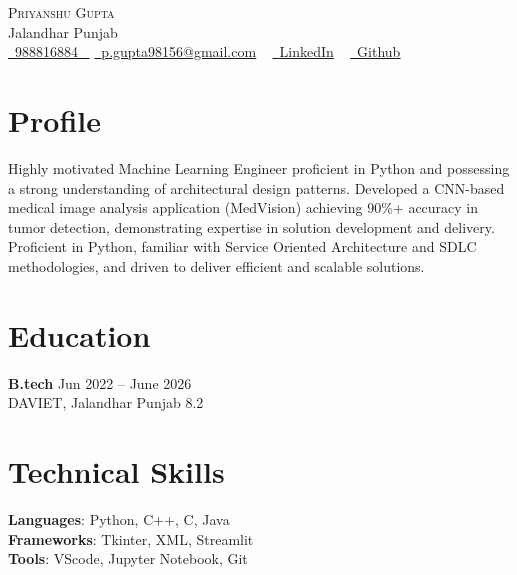\documentclass[letterpaper,11pt]{article}
\begin{document}

\begin{center}
    {\Huge \scshape Priyanshu Gupta} \\ \vspace{1pt}
    Jalandhar Punjab \\ \vspace{1pt}
    \small 
    \small \href{988816884}{ \raisebox{-0.1\height}\faPhone\ \underline{988816884} ~} 
    \href{p.gupta98156@gmail.com}{\raisebox{-0.2\height}\faEnvelope\  \underline{p.gupta98156@gmail.com}} ~
    \href{https://www.linkedin.com/in/priyanshu-gupta18/}{\raisebox{-0.2\height}\faLinkedinSquare\ \underline{LinkedIn}}  ~
    \href{https://github.com/Priyanshu98156/MedVision}{\raisebox{-0.2\height}\faGithub\ \underline{Github}} ~
\end{center}
% 

\section{Profile}
Highly motivated Machine Learning Engineer proficient in Python and possessing a strong understanding of architectural design patterns. Developed a CNN-based medical image analysis application (MedVision) achieving 90\%+ accuracy in tumor detection, demonstrating expertise in solution development and delivery.  Proficient in Python, familiar with Service Oriented Architecture and SDLC methodologies, and driven to deliver efficient and scalable solutions.\\ 


\section*{Education}
\textbf{B.tech} \hfill Jun 2022 -- June 2026 \\[2pt]
DAVIET, Jalandhar Punjab \hfill 8.2 \\[6pt]






\section*{Technical Skills}
\textbf{Languages}: Python, C++, C, Java \\[4pt]
\textbf{Frameworks}: Tkinter, XML, Streamlit \\[4pt]
\textbf{Tools}: VScode, Jupyter Notebook, Git \\[4pt]
\end{document}
